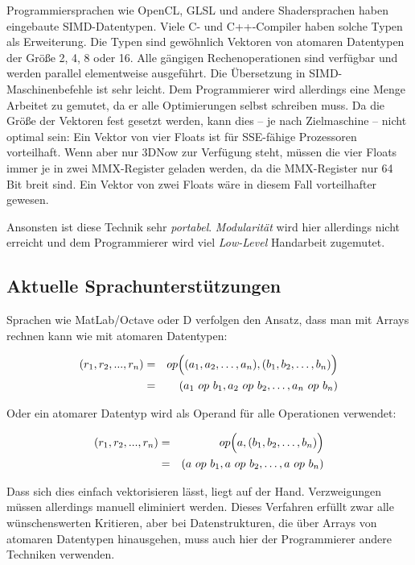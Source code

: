 \documentclass[a4paper,10pt]{article}
\begin{document}
Programmiersprachen wie OpenCL, GLSL und andere Shadersprachen haben eingebaute SIMD-Datentypen.
Viele C- und C++-Compiler haben solche Typen als Erweiterung. Die Typen sind gewöhnlich Vektoren von
atomaren Datentypen der Größe 2, 4, 8 oder 16. Alle gängigen Rechenoperationen sind verfügbar und
werden parallel elementweise ausgeführt. Die Übersetzung in SIMD-Maschinenbefehle ist sehr leicht.
Dem Programmierer wird allerdings eine Menge Arbeitet zu gemutet, da er alle Optimierungen selbst
schreiben muss. Da die Größe der Vektoren fest gesetzt werden, kann dies -- je nach Zielmaschine --
nicht optimal sein: Ein Vektor von vier Floats ist für SSE-fähige Prozessoren vorteilhaft. Wenn aber
nur 3DNow zur Verfügung steht, müssen die vier Floats immer je in zwei MMX-Register geladen werden,
da die MMX-Register nur 64 Bit breit sind. Ein Vektor von zwei Floats wäre in diesem Fall
vorteilhafter gewesen.

Ansonsten ist diese Technik sehr \emph{portabel}. \emph{Modularität} wird hier allerdings nicht
erreicht und dem Programmierer wird viel \emph{Low-Level} Handarbeit zugemutet.


\subsection{Aktuelle Sprachunterstützungen}

Sprachen wie MatLab/Octave oder D verfolgen den Ansatz, dass man mit Arrays rechnen kann wie mit
atomaren Datentypen:

\begin{eqnarray*}
    (r_1, r_2, ..., r_n)    & = & op\Bigl( (a_1, a_2, \dots, a_n), (b_1, b_2, \dots, b_n) \Bigr)\\ 
                            & = & (a_1 \ op \ b_1, a_2 \ op \ b_2, \dots, a_n \ op \ b_n)
\end{eqnarray*}

Oder ein atomarer Datentyp wird als Operand für alle Operationen verwendet:

\begin{eqnarray*}
    (r_1, r_2, ..., r_n)    & = & op\Bigl( a, (b_1, b_2, \dots, b_n) \Bigr)\\ 
                            & = & (a \ op \ b_1, a \ op \ b_2, \dots, a \ op \ b_n)
\end{eqnarray*}

Dass sich dies einfach vektorisieren lässt, liegt auf der Hand. Verzweigungen müssen allerdings
manuell eliminiert werden. Dieses Verfahren erfüllt zwar alle wünschenswerten Kritieren, aber bei
Datenstrukturen, die über Arrays von atomaren Datentypen hinausgehen, muss auch hier der
Programmierer andere Techniken verwenden.
\end{document}
